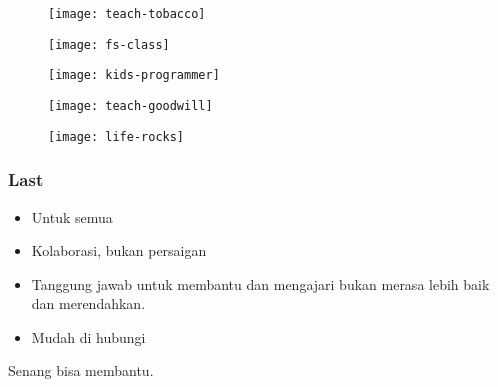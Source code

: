 \documentclass[notes]{beamer}       %
\begin{document}
\begin{frame}
  \begin{figure}
    \centering
    \texttt{[image: teach-tobacco]}
  \end{figure}
\end{frame}

\begin{frame}
  \begin{figure}
    \centering
    \texttt{[image: fs-class]}
  \end{figure}
\end{frame}

\begin{frame}
  \begin{figure}
    \centering
    \texttt{[image: kids-programmer]}
  \end{figure}
\end{frame}

\begin{frame}
  \begin{figure}
    \centering
    \texttt{[image: teach-goodwill]}
  \end{figure}
\end{frame}

\begin{frame}
  \begin{figure}
    \centering
    \texttt{[image: life-rocks]}
  \end{figure}
\end{frame}

\begin{frame}
  \frametitle{Last}
  \begin{itemize}[<+-+>]
  \item Untuk semua
  \item Kolaborasi, bukan persaigan
  \item Tanggung jawab untuk membantu dan mengajari
    bukan merasa lebih baik dan merendahkan.
  \item Mudah di hubungi
  \end{itemize}
\end{frame}

\begin{frame}
  \begin{center}
    \Huge Senang bisa membantu.
  \end{center}
\end{frame}
\end{document}
